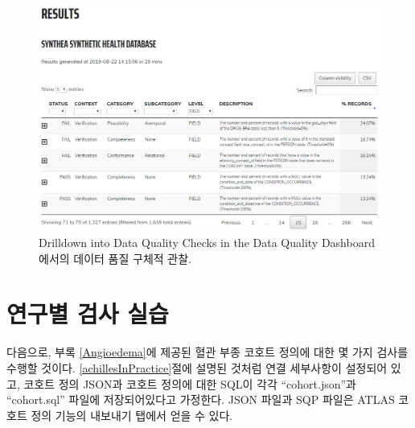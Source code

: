 \documentclass[10.5pt]{book}
\newenvironment{Shaded}{\begin{snugshade}}{\end{snugshade}}
\newcommand{\KeywordTok}[1]{\textcolor[rgb]{0.13,0.29,0.53}{\textbf{#1}}}
\newcommand{\DataTypeTok}[1]{\textcolor[rgb]{0.13,0.29,0.53}{#1}}
\newcommand{\StringTok}[1]{\textcolor[rgb]{0.31,0.60,0.02}{#1}}
\newcommand{\OperatorTok}[1]{\textcolor[rgb]{0.81,0.36,0.00}{\textbf{#1}}}
\newcommand{\NormalTok}[1]{#1}
\theoremstyle{definition}
\theoremstyle{definition}
\theoremstyle{definition}
\theoremstyle{remark}
\begin{document}
\begin{figure}

{\centering \includegraphics[width=1\linewidth]{images/DataQuality/dqdResults} 

}

\caption{Drilldown into Data Quality Checks in the Data Quality Dashboard 에서의 데이터 품질 구체적 관찰.}\label{fig:dqdResults}
\end{figure}

\section{연구별 검사 실습}\label{--}

다음으로, 부록 \ref{Angioedema}에 제공된 혈관 부종 코호트 정의에 대한 몇
가지 검사를 수행할 것이다. \ref{achillesInPractice}절에 설명된 것처럼
연결 세부사항이 설정되어 있고, 코호트 정의 JSON과 코호트 정의에 대한
SQL이 각각 ``cohort.json''과 ``cohort.sql'' 파일에 저장되어있다고
가정한다. JSON 파일과 SQP 파일은 ATLAS 코호트 정의 기능의 내보내기
탭에서 얻을 수 있다.

\begin{Shaded}
\end{Shaded}
\end{document}
